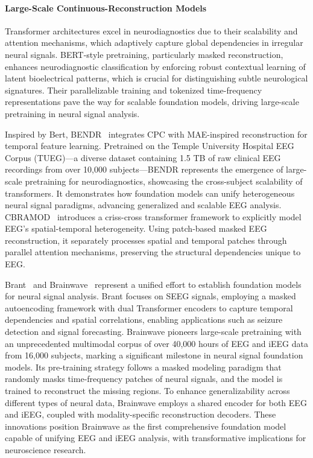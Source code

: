 \paragraph{Large-Scale Continuous-Reconstruction Models}
Transformer architectures excel in neurodiagnostics due to their scalability and attention mechanisms, which adaptively capture global dependencies in irregular neural signals. BERT-style pretraining, particularly masked reconstruction, enhances neurodiagnostic classification by enforcing robust contextual learning of latent bioelectrical patterns, which is crucial for distinguishing subtle neurological signatures. Their parallelizable training and tokenized time-frequency representations pave the way for scalable foundation models, driving large-scale pretraining in neural signal analysis.

Inspired by Bert, BENDR~\cite{Kostas2021BENDR} integrates CPC with MAE-inspired reconstruction for temporal feature learning. 
Pretrained on the Temple University Hospital EEG Corpus (TUEG)—a diverse dataset containing 1.5 TB of raw clinical EEG recordings from over 10,000 subjects—BENDR represents the emergence of large-scale pretraining for neurodiagnostics, showcasing the cross-subject scalability of transformers. 
It demonstrates how foundation models can unify heterogeneous neural signal paradigms, advancing generalized and scalable EEG analysis.
CBRAMOD~\cite{wang2024cbramod} introduces a criss-cross transformer framework to explicitly model EEG’s spatial-temporal heterogeneity.
Using patch-based masked EEG reconstruction, it separately processes spatial and temporal patches through parallel attention mechanisms, preserving the structural dependencies unique to EEG.

Brant~\cite{zhang2024brant} and Brainwave~\cite{yuan2024brainwavebrainsignalfoundation}
represent a unified effort to establish foundation models for neural signal analysis. 
Brant focuses on SEEG signals, employing a masked autoencoding framework with dual Transformer
encoders to capture temporal dependencies and spatial
correlations, enabling applications such as seizure detection and signal forecasting.
Brainwave pioneers large-scale pretraining with an unprecedented multimodal corpus of over 40,000 hours of EEG and iEEG data from 16,000 subjects, marking a significant milestone in neural signal foundation models. Its pre-training strategy follows a masked modeling paradigm that randomly masks time-frequency patches of neural signals, and the model is trained to reconstruct the missing regions. To enhance generalizability across different types of neural data, Brainwave employs a shared encoder for both EEG and iEEG, coupled with modality-specific reconstruction decoders. These innovations position Brainwave as the first comprehensive foundation model capable of unifying EEG and iEEG analysis, with transformative implications for neuroscience research.
